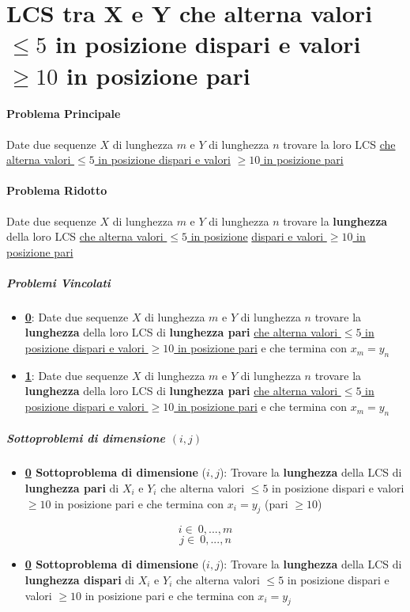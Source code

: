 \documentclass[12pt]{article}
\begin{document}
\section{LCS tra X e Y che alterna valori $\leq 5$ in posizione dispari e valori $\geq 10$ in posizione pari}
\paragraph{Problema Principale}
Date due sequenze $X$ di lunghezza $m$ e $Y$ di lunghezza $n$ trovare la loro LCS \underline{che alterna valori $\leq 5$ in posizione dispari e valori} \underline{$\geq 10$ in posizione pari}
\paragraph{Problema Ridotto}
Date due sequenze $X$ di lunghezza $m$ e $Y$ di lunghezza $n$ trovare la \textbf{lunghezza} della loro LCS \underline{che alterna valori $\leq 5$ in posizione} \underline{dispari e valori $\geq 10$ in posizione pari}
\subparagraph{Problemi Vincolati}
\begin{itemize}
    \item \textbf{\underline{0}}: Date due sequenze $X$ di lunghezza $m$ e $Y$ di lunghezza $n$ trovare la \textbf{lunghezza} della loro LCS di \textbf{lunghezza pari} \underline{che alterna valori $\leq 5$ in} \underline{posizione dispari e valori $\geq 10$ in posizione pari} e che termina con $x_m = y_n$
    \item \textbf{\underline{1}}: Date due sequenze $X$ di lunghezza $m$ e $Y$ di lunghezza $n$ trovare la \textbf{lunghezza} della loro LCS di \textbf{lunghezza pari} \underline{che alterna valori $\leq 5$ in} \underline{posizione dispari e valori $\geq 10$ in posizione pari} e che termina con $x_m = y_n$
\end{itemize}
\subparagraph{Sottoproblemi di dimensione $(i, j)$}
\begin{itemize}
    \item \textbf{\underline{0} Sottoproblema di dimensione} ($i, j$): Trovare la \textbf{lunghezza} della LCS di \textbf{lunghezza pari} di $X_i$ e $Y_i$ che alterna valori $\leq 5$ in posizione dispari e valori $\geq 10$ in posizione pari e che termina con $x_i = y_j$ (pari $\geq 10$)
\end{itemize}
$$i\in \ {0,...,m}$$
$$j\in \ {0,...,n}$$
\begin{itemize}
    \item \textbf{\underline{0} Sottoproblema di dimensione} ($i, j$): Trovare la \textbf{lunghezza} della LCS di \textbf{lunghezza dispari} di $X_i$ e $Y_i$ che alterna valori $\leq 5$ in posizione dispari e valori $\geq 10$ in posizione pari e che termina con $x_i = y_j$
\end{itemize}
\end{document}
